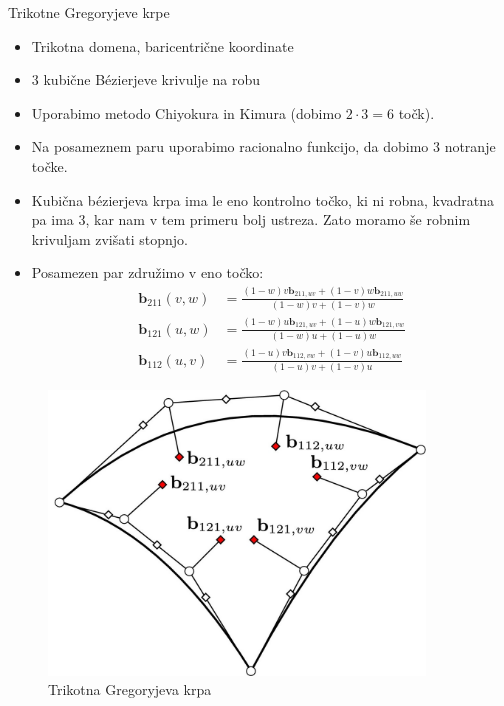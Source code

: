 \documentclass[a4paper,8pt]{beamer}
\newcommand{\tbf}{\textbf}
\begin{document}
\begin{frame}{Trikotne Gregoryjeve krpe}
	\begin{itemize}
		\item Trikotna domena, baricentrične koordinate
		\item 3 kubične Bézierjeve krivulje na robu
		\item Uporabimo metodo Chiyokura in Kimura (dobimo $2 \cdot 3 = 6$ točk).
		\item Na posameznem paru uporabimo racionalno funkcijo, da dobimo 3 notranje točke.
		\item Kubična bézierjeva krpa ima le eno kontrolno točko, ki ni robna, kvadratna pa ima 3, kar nam v tem primeru bolj ustreza. Zato moramo še robnim krivuljam zvišati stopnjo.
		\item Posamezen par združimo v eno točko:
		\begin{align*}
		\tbf{b}_{211} (v, w) &= \frac{(1-w)v \tbf{b}_{211,uv}+(1-v)w\tbf{b}_{211,uw}}{(1-w)v+(1-v)w} \\
		\tbf{b}_{121} (u, w) &= \frac{(1-w)u \tbf{b}_{121,uv}+(1-u)w\tbf{b}_{121,vw}}{(1-w)u+(1-u)w} \\
		\tbf{b}_{112} (u, v) &= \frac{(1-u)v \tbf{b}_{112,vw}+(1-v)u\tbf{b}_{112,uw}}{(1-u)v+(1-v)u} 
		\end{align*}
	\end{itemize}
\end{frame}
\begin{frame}
	\begin{figure}[h]
		\centering
		\includegraphics[width=10cm]{gregory_krpe_trikotna.jpg}
		\caption{Trikotna Gregoryjeva krpa}
	\end{figure}
\end{frame}
\end{document}
